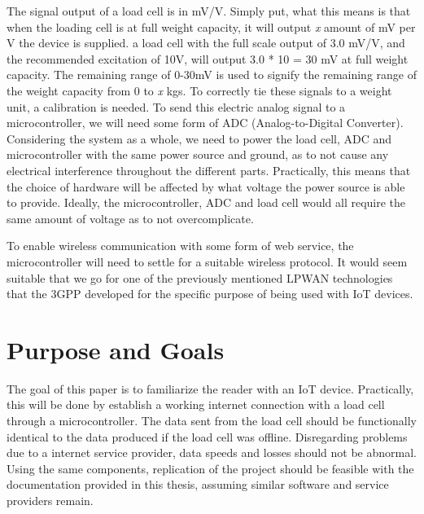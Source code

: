 The signal output of a load cell is in mV/V\cite{load-cell-spec}. Simply put, what this means is that when the loading cell is at full weight capacity, it will output \textit{x} amount of mV per V the device is supplied. \eg a load cell with the full scale output of 3.0 mV/V, and the recommended excitation of 10V, will output 3.0 * 10 = 30 mV at full weight capacity. The remaining range of 0-30mV is used to signify the remaining range of the weight capacity from 0 to \textit{x} kgs. To correctly tie these signals to a weight unit, a calibration is needed. To send this electric analog signal to a microcontroller, we will need some form of ADC (Analog-to-Digital Converter). Considering the system as a whole, we need to power the load cell, ADC and microcontroller with the same power source and ground, as to not cause any electrical interference throughout the different parts. Practically, this means that the choice of hardware will be affected by what voltage the power source is able to provide. Ideally, the microcontroller, ADC and load cell would all require the same amount of voltage as to not overcomplicate. 

To enable wireless communication with some form of web service, the microcontroller will need to settle for a suitable wireless protocol. It would seem suitable that we go for one of the previously mentioned LPWAN technologies that the 3GPP developed for the specific purpose of being used with IoT devices.





\section{Purpose and Goals}

The goal of this paper is to familiarize the reader with an IoT device. Practically, this will be done by establish a working internet connection with a load cell through a microcontroller. The data sent from the load cell should be functionally identical to the data produced if the load cell was offline. Disregarding problems due to a internet service provider, data speeds and losses should not be abnormal. Using the same components, replication of the project should be feasible with the documentation provided in this thesis, assuming similar software and service providers remain. 


